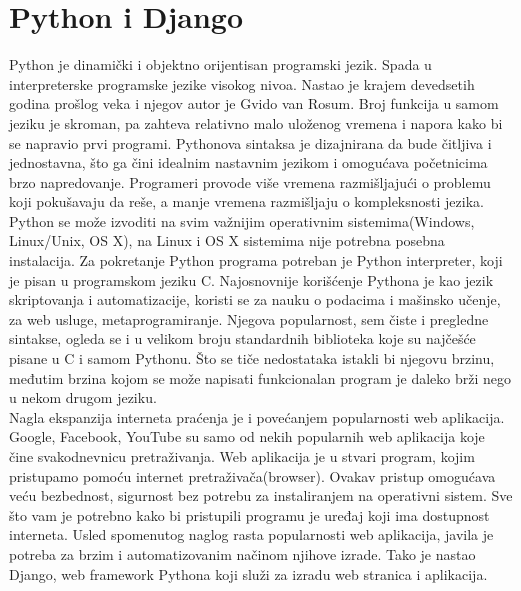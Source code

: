 \documentclass[12pt]{article}
\begin{document}
\section{Python i Django}

Python je dinamički i objektno orijentisan programski jezik. Spada u interpreterske programske jezike visokog nivoa. Nastao je krajem devedsetih godina prošlog veka i njegov autor je Gvido van Rosum.  Broj funkcija u samom jeziku je skroman, pa zahteva relativno malo uloženog vremena i napora kako bi se napravio prvi programi. Pythonova sintaksa je dizajnirana da bude čitljiva i jednostavna, što ga čini idealnim nastavnim jezikom i omogućava početnicima brzo napredovanje. Programeri provode više vremena razmišljajući o problemu koji pokušavaju da reše, a manje vremena razmišljaju o kompleksnosti jezika. Python se može izvoditi na svim važnijim operativnim sistemima(Windows, Linux/Unix, OS X), na Linux i OS X sistemima nije potrebna posebna instalacija. Za pokretanje Python programa potreban je Python interpreter, koji je pisan u programskom jeziku C. 
Najosnovnije korišćenje Pythona je kao jezik skriptovanja i automatizacije, koristi se za nauku o podacima i mašinsko učenje, za web usluge, metaprogramiranje. Njegova popularnost, sem čiste i pregledne sintakse, ogleda se i u velikom broju standardnih biblioteka koje su najčešće pisane u C i samom Pythonu.  Što se tiče nedostataka istakli bi njegovu brzinu, međutim brzina kojom se može napisati funkcionalan program je daleko brži nego u nekom drugom jeziku.  \\

Nagla ekspanzija interneta praćenja je i povećanjem popularnosti web aplikacija. Google, Facebook, YouTube su samo od nekih popularnih web aplikacija koje čine svakodnevnicu pretraživanja. Web aplikacija je u stvari program, kojim pristupamo pomoću internet pretraživača(browser). Ovakav pristup omogućava veću bezbednost, sigurnost bez potrebu za instaliranjem na operativni sistem. Sve što vam je potrebno kako bi pristupili programu je uređaj koji ima dostupnost interneta. 
Usled spomenutog naglog rasta popularnosti web aplikacija, javila je potreba za brzim i automatizovanim načinom njihove izrade. Tako je nastao Django, web framework  Pythona koji služi za izradu web stranica i aplikacija. 
\end{document}

